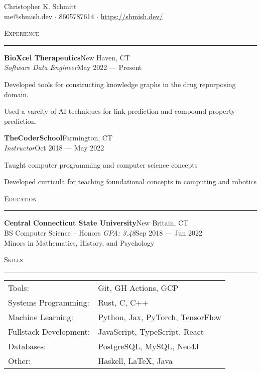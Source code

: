 \documentclass[a4paper]{article}
\newenvironment{cvsection}[1]{%
    \noindent
    \textsc{#1}
    \vspace{4pt}
    \hrule
    \vspace{4pt}
}{\vspace{2pt}}
\newcommand{\school}[6] {
    \noindent\textbf{#1}\hfill#2\\
    \noindent#3 \textit{GPA: #4}\hfill#5\\
    \noindent\vspace{8pt}Minors in #6\\
}
\newcommand{\employer}[5] {
    \noindent\textbf{#1}\hfill#2\\
    \noindent\textit{#3}\hfill#4
    \begin{compactitem}
        #5
    \end{compactitem}
    \vspace{16pt}
}
\begin{document}
    \begin{center}
        {\huge Christopher K. Schmitt}\\
        \vspace{8pt}
        me@shmish.dev $\cdot$ 8605787614 $\cdot$ \href{https://shmish.dev/}{https://shmish.dev/}
    \end{center}

    \begin{cvsection}{Experience}
        \employer{BioXcel Therapeutics}{New Haven, CT}{Software Data Engineer}{May 2022 --- Present}{
            \item Developed tools for constructing knowledge graphs in the drug repurposing domain.
            \item Used a vareity of AI techniques for link prediction and compound property prediction.
        }

        \employer{TheCoderSchool}{Farmington, CT}{Instructor}{Oct 2018 --- May 2022}{
            \item Taught computer programming and computer science concepts
            \item Developed curricula for teaching foundational concepts in computing and robotics
        }
    \end{cvsection}

    \begin{cvsection}{Education}
        \school{Central Connecticut State University}{New Britain, CT}{BS Computer Science -- Honors}{3.48}{Sep 2018 --- Jun 2022}{Mathematics, History, and Psychology}
    \end{cvsection}

    \begin{cvsection}{Skills}
        \begin{tabular}{ l l }
            Tools:                      & Git, GH Actions, GCP\\
            Systems Programming:        & Rust, C, C++\\
            Machine Learning:           & Python, Jax, PyTorch, TensorFlow\\
            Fullstack Development:      & JavaScript, TypeScript, React\\
            Databases:                  & PostgreSQL, MySQL, Neo4J\\
            Other:                      & Haskell, LaTeX, Java\\
        \end{tabular}
        \vspace{16pt}
    \end{cvsection}
\end{document}
